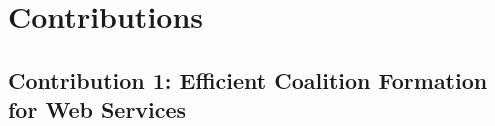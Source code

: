 
\section{Contributions}\label{sec:motexample}

\subsection{Contribution 1: Efficient Coalition Formation for Web Services} 


